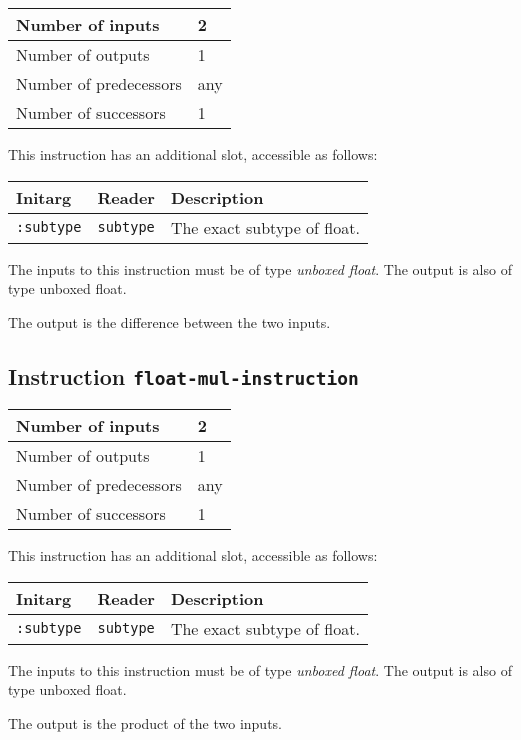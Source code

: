 \begin{tabular}{|l|l|}
\hline
Number of inputs & 2\\
\hline
Number of outputs & 1\\
\hline
Number of predecessors & any\\
\hline
Number of successors & 1\\
\hline
\end{tabular}

This instruction has an additional slot, accessible as follows:

\begin{tabular}{|l|l|l|}
  \hline
  Initarg & Reader & Description\\
  \hline\hline
  \texttt{:subtype} & \texttt{subtype} & The exact subtype of float.\\
  \hline
\end{tabular}

The inputs to this instruction must be of type \emph{unboxed
  float}. The output is also of type unboxed float.

The output is the difference between the two inputs.

\subsection{Instruction \texttt{float-mul-instruction}}
\label{hir-instruction-float-mul}

\begin{tabular}{|l|l|}
\hline
Number of inputs & 2\\
\hline
Number of outputs & 1\\
\hline
Number of predecessors & any\\
\hline
Number of successors & 1\\
\hline
\end{tabular}

This instruction has an additional slot, accessible as follows:

\begin{tabular}{|l|l|l|}
  \hline
  Initarg & Reader & Description\\
  \hline\hline
  \texttt{:subtype} & \texttt{subtype} & The exact subtype of float.\\
  \hline
\end{tabular}

The inputs to this instruction must be of type \emph{unboxed
  float}. The output is also of type unboxed float.

The output is the product of the two inputs.


